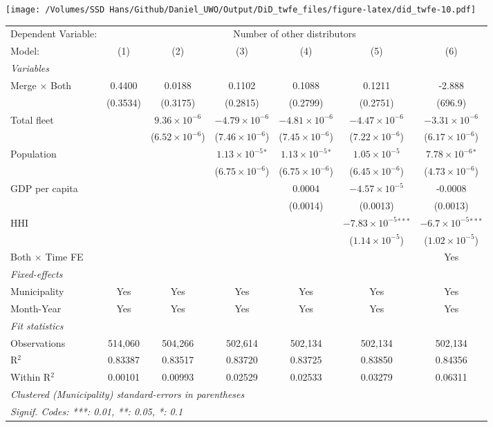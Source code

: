 \documentclass[
]{article}
\begin{document}
\texttt{[image: /Volumes/SSD Hans/Github/Daniel\_UWO/Output/DiD\_twfe\_files/figure-latex/did\_twfe-10.pdf]}

\begin{tabular}{lcccccc}
\tabularnewline\midrule\midrule
Dependent Variable:&\multicolumn{6}{c}{Number of other distributors}\\
Model:&(1) & (2) & (3) & (4) & (5) & (6)\\
\midrule \emph{Variables}&   &   &   &   &   &  \\
Merge $\times $ Both & 0.4400 & 0.0188 & 0.1102 & 0.1088 & 0.1211 & -2.888\\
  &(0.3534) & (0.3175) & (0.2815) & (0.2799) & (0.2751) & (696.9)\\
Total fleet &    & $9.36\times 10^{-6}$ & $-4.79\times 10^{-6}$ & $-4.81\times 10^{-6}$ & $-4.47\times 10^{-6}$ & $-3.31\times 10^{-6}$\\
  &   & ($6.52\times 10^{-6}$) & ($7.46\times 10^{-6}$) & ($7.45\times 10^{-6}$) & ($7.22\times 10^{-6}$) & ($6.17\times 10^{-6}$)\\
Population &    &    & $1.13\times 10^{-5}$$^{*}$ & $1.13\times 10^{-5}$$^{*}$ & $1.05\times 10^{-5}$ & $7.78\times 10^{-6}$$^{*}$\\
  &   &    & ($6.75\times 10^{-6}$) & ($6.75\times 10^{-6}$) & ($6.45\times 10^{-6}$) & ($4.73\times 10^{-6}$)\\
GDP per capita &    &    &    & 0.0004 & $-4.57\times 10^{-5}$ & -0.0008\\
  &   &    &    & (0.0014) & (0.0013) & (0.0013)\\
HHI &    &    &    &    & $-7.83\times 10^{-5}$$^{***}$ & $-6.7\times 10^{-5}$$^{***}$\\
  &   &    &    &    & ($1.14\times 10^{-5}$) & ($1.02\times 10^{-5}$)\\
Both $\times$ Time FE &  &  &  &  &  & Yes\\
\midrule \emph{Fixed-effects}&   &   &   &   &   &  \\
Municipality & Yes & Yes & Yes & Yes & Yes & Yes\\
Month-Year & Yes & Yes & Yes & Yes & Yes & Yes\\
\midrule \emph{Fit statistics}&  & & & & & \\
Observations & 514,060&504,266&502,614&502,134&502,134&502,134\\
R$^2$ & 0.83387&0.83517&0.83720&0.83725&0.83850&0.84356\\
Within R$^2$ & 0.00101&0.00993&0.02529&0.02533&0.03279&0.06311\\
\midrule\midrule\multicolumn{7}{l}{\emph{Clustered (Municipality) standard-errors in parentheses}}\\
\multicolumn{7}{l}{\emph{Signif. Codes: ***: 0.01, **: 0.05, *: 0.1}}\\
\end{tabular}
\end{document}

